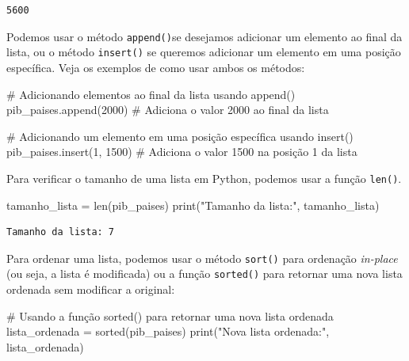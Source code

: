 \documentclass[
  portuguese,
  letterpaper,
  DIV=11,
  numbers=noendperiod]{scrreprt}
\newenvironment{Shaded}{\begin{snugshade}}{\end{snugshade}}
\newcommand{\BuiltInTok}[1]{\textcolor[rgb]{0.00,0.23,0.31}{#1}}
\newcommand{\CommentTok}[1]{\textcolor[rgb]{0.37,0.37,0.37}{#1}}
\newcommand{\DecValTok}[1]{\textcolor[rgb]{0.68,0.00,0.00}{#1}}
\newcommand{\NormalTok}[1]{\textcolor[rgb]{0.00,0.23,0.31}{#1}}
\newcommand{\OperatorTok}[1]{\textcolor[rgb]{0.37,0.37,0.37}{#1}}
\newcommand{\StringTok}[1]{\textcolor[rgb]{0.13,0.47,0.30}{#1}}
\theoremstyle{definition}
\theoremstyle{remark}
\begin{document}
\begin{verbatim}
5600
\end{verbatim}

Podemos usar o método \texttt{append()}se desejamos adicionar um
elemento ao final da lista, ou o método \texttt{insert()} se queremos
adicionar um elemento em uma posição específica. Veja os exemplos de
como usar ambos os métodos:

\begin{Shaded}
\begin{Highlighting}[]
\CommentTok{\# Adicionando elementos ao final da lista usando append()}
\NormalTok{pib\_paises.append(}\DecValTok{2000}\NormalTok{)  }\CommentTok{\# Adiciona o valor 2000 ao final da lista}

\CommentTok{\# Adicionando um elemento em uma posição específica usando insert()}
\NormalTok{pib\_paises.insert(}\DecValTok{1}\NormalTok{, }\DecValTok{1500}\NormalTok{)  }\CommentTok{\# Adiciona o valor 1500 na posição 1 da lista}
\end{Highlighting}
\end{Shaded}

Para verificar o tamanho de uma lista em Python, podemos usar a função
\texttt{len()}.

\begin{Shaded}
\begin{Highlighting}[]
\NormalTok{tamanho\_lista }\OperatorTok{=} \BuiltInTok{len}\NormalTok{(pib\_paises)}
\BuiltInTok{print}\NormalTok{(}\StringTok{"Tamanho da lista:"}\NormalTok{, tamanho\_lista) }
\end{Highlighting}
\end{Shaded}

\begin{verbatim}
Tamanho da lista: 7
\end{verbatim}

Para ordenar uma lista, podemos usar o método \texttt{sort()} para
ordenação \emph{in-place} (ou seja, a lista é modificada) ou a função
\texttt{sorted()} para retornar uma nova lista ordenada sem modificar a
original:

\begin{Shaded}
\begin{Highlighting}[]
\CommentTok{\# Usando a função sorted() para retornar uma nova lista ordenada}
\NormalTok{lista\_ordenada }\OperatorTok{=} \BuiltInTok{sorted}\NormalTok{(pib\_paises)}
\BuiltInTok{print}\NormalTok{(}\StringTok{"Nova lista ordenada:"}\NormalTok{, lista\_ordenada)}
\end{Highlighting}
\end{Shaded}
\end{document}
